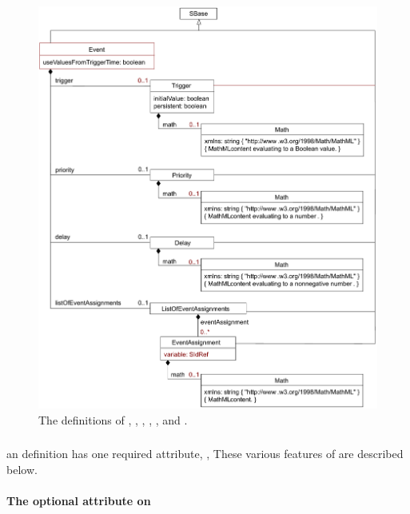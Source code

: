 \begin{figure}[htb]
  \centering
  \small
  \vspace*{-1ex}
  \includegraphics[scale=0.77]{figs/event-uml}
  \vspace*{-1ex}
  \caption{The definitions of \Event, \Trigger, \Delay, \Priority,
    \EventAssignment, and \ListOfEventAssignments.}
  \label{fig:event}
\end{figure}


\subsubsection{}

an \Event definition has one required attribute, ,
These various features of \Event are described below.


\paragraph{The optional  attribute on }
\label{sec:event-sboterm}

